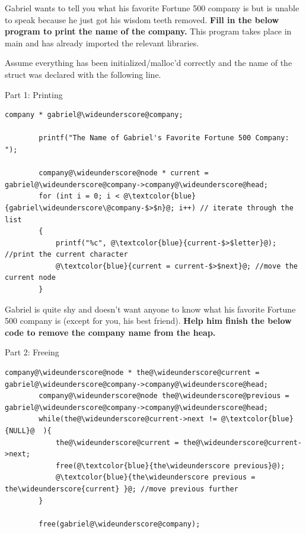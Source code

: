 \documentclass{article}
\newcommand{\wideunderscore}{\underline{\hphantom{n}}}
\begin{document}
\begin{enumerate}[label=(\alph*)]
    \vspace{2.5cm} %
    
    Gabriel wants to tell you what his favorite Fortune 500 company is but is unable to speak because he just got his wisdom teeth removed. \textbf{Fill in the below program to print the name of the company.} This program takes place in main and has already imported the relevant libraries. 

    Assume everything has been initialized/malloc'd correctly and the name of the struct was declared with the following line. 

    Part 1: Printing

    \begin{lstlisting}[style = CStyle]
        company * gabriel@\wideunderscore@company;

        printf("The Name of Gabriel's Favorite Fortune 500 Company: ");

        company@\wideunderscore@node * current = gabriel@\wideunderscore@company->company@\wideunderscore@head;
        for (int i = 0; i < @\textcolor{blue}{gabriel\wideunderscore\@company-$>$n}@; i++) // iterate through the list
        { 
            printf("%c", @\textcolor{blue}{current-$>$letter}@); //print the current character
            @\textcolor{blue}{current = current-$>$next}@; //move the current node
        }
    \end{lstlisting}
    
    Gabriel is quite shy and doesn't want anyone to know what his favorite Fortune 500 company is (except for you, his best friend). \textbf{Help him finish the below code to remove the company name from the heap.}

    Part 2: Freeing
    \begin{lstlisting}[style = CStyle]
        company@\wideunderscore@node * the@\wideunderscore@current = gabriel@\wideunderscore@company->company@\wideunderscore@head;
        company@\wideunderscore@node the@\wideunderscore@previous = gabriel@\wideunderscore@company->company@\wideunderscore@head;
        while(the@\wideunderscore@current->next != @\textcolor{blue}{NULL}@  ){
            the@\wideunderscore@current = the@\wideunderscore@current->next;
            free(@\textcolor{blue}{the\wideunderscore previous}@);
            @\textcolor{blue}{the\wideunderscore previous = the\wideunderscore{current} }@; //move previous further
        }

        free(gabriel@\wideunderscore@company);
    \end{lstlisting}


\end{enumerate}
\end{document}
